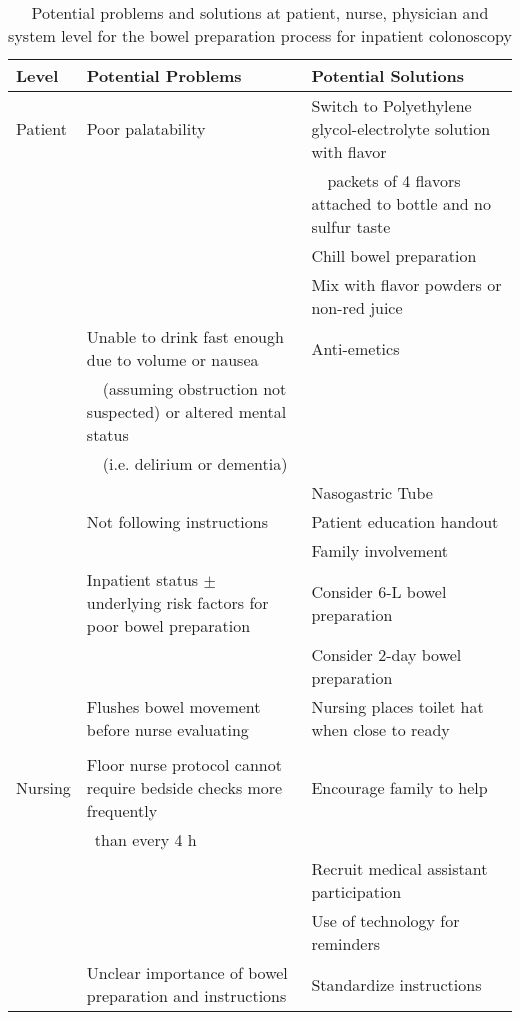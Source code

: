 %
\hypertarget{Potential problems and solutions at patient, nurse, physician and system level for the bowel preparation process for inpatient colonoscopy}{}
 \begin{flushleft}
 \begin{table}
  \caption{Potential problems and solutions at patient, nurse, physician and system level for the bowel preparation process for inpatient colonoscopy}
  \label{table:problems}
    \begin{tiny}
    \begin{tabular}{lll} \hline
    \textbf{Level} & \textbf{Potential Problems} & \textbf{Potential Solutions}\\ \hline
    Patient & Poor palatability & Switch to Polyethylene glycol-electrolyte solution with flavor\\
     & & \ \ packets of 4 flavors attached to bottle and no sulfur taste\\
     & & Chill bowel preparation \\
     & & Mix with flavor powders or non-red juice \\
     & Unable to drink fast enough due to volume or nausea & Anti-emetics\\
     & \ \ (assuming obstruction not suspected) or altered mental status & \\
     & \ \ (i.e. delirium or dementia) & \\
     & & Nasogastric Tube\\
     & Not following instructions & Patient education handout \\
     & & Family involvement\\
     & Inpatient status $\pm$ underlying risk factors for poor bowel preparation & Consider 6-L bowel preparation \\
     & & Consider 2-day bowel preparation\\
     & Flushes bowel movement before nurse evaluating & Nursing places toilet hat when close to ready \\
     & & \\
    Nursing & Floor nurse protocol cannot require bedside checks more frequently & Encourage family to help \\
     & \ than every 4 h & \\
     & & Recruit medical assistant participation \\
     & & Use of technology for reminders\\
     & Unclear importance of bowel preparation and instructions & Standardize instructions\\

\end{tabular}
\end{tiny}
\end{table}
\end{flushleft}

